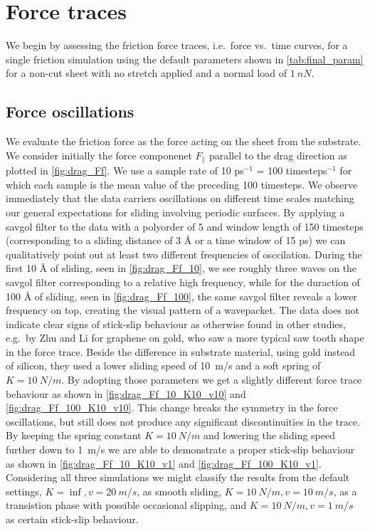 \section{Force traces}\label{sec:single_analysis}
We begin by assessing the friction force traces, i.e.\ force vs.\ time curves, for a single friction simulation using the default parameters shown in \cref{tab:final_param} for a non-cut sheet with
no stretch applied and a normal load of $\SI{1}{nN}$. 


\subsection{Force oscillations}\label{sec:force_oscillations}
We evaluate the friction force as the force acting on the sheet from the
substrate. We consider initially the force componenet $F_{\parallel}$ parallel
to the drag direction as plotted in \cref{fig:drag_Ff}. We use a sample rate of
10 ps$^{-1}$ = 100 timesteps$^{-1}$ for which each sample is the mean value of
the preceding 100 timesteps. We observe immediately that the data carriers
oscillations on different time scales matching our general expectations for
sliding involving periodic surfaces. By applying a savgol filter to the data
with a polyorder of 5 and window length of 150 timesteps (corresponding to a
sliding distance of 3 Å or a time window of 15 ps) we can qualitatively point
out at least two different frequencies of osccilation. During the first 10 Å of
sliding, seen in \cref{fig:drag_Ff_10}, we see roughly three waves on the savgol
filter corresponding to a relative high frequency, while for the duraction of
100 Å of sliding, seen in \cref{fig:drag_Ff_100}, the same savgol filter reveals
a lower frequency on top, creating the visual pattern of a wavepacket. The data
does not indicate clear signs of stick-slip behaviour as otherwise found in
other studies, e.g.\ by Zhu and Li \cite{zhu_study_2018} for graphene on gold,
who saw a more typical saw tooth shape in the force trace. Beside the difference
in substrate material, using gold instead of silicon, they used a lower sliding
speed of \SI{10}{m/s} and a soft spring of $K = \SI{10}{N/m}$. By adopting those
parameters we get a slightly different force trace behaviour as shown in
\cref{fig:drag_Ff_10_K10_v10} and \cref{fig:drag_Ff_100_K10_v10}. This change
breaks the symmetry in the force oscillations, but still does not produce any
significant discontinuities in the trace. By keeping the spring constant $K =
\SI{10}{N/m}$ and lowering the sliding speed further down to \SI{1}{m/s} we are
able to demonstrate a proper stick-slip behaviour as shown in
\cref{fig:drag_Ff_10_K10_v1} and \cref{fig:drag_Ff_100_K10_v1}. Considering all
three simulations we might classify the results from the default settings, $K =
\inf, v = \SI{20}{m/s}$, as smooth sliding,  $K = \SI{10}{N/m}, v =
\SI{10}{m/s}$, as a transistion phase with possible occasional slipping, and $K
= \SI{10}{N/m}, v = \SI{1}{m/s}$ as certain stick-slip behaviour.


